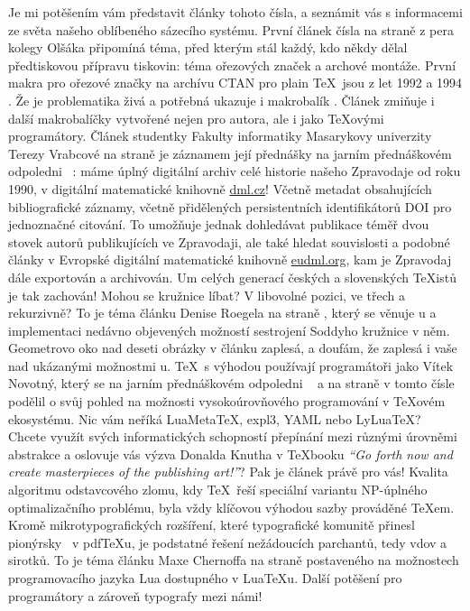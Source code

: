 Je mi potěšením vám představit články tohoto čísla, a seznámit vás s informacemi ze světa našeho oblíbeného sázecího systému.
První článek čísla na straně  z pera kolegy Olšáka připomíná téma, před kterým stál každý, kdo někdy dělal předtiskovou přípravu tiskovin: téma ořezových značek a archové montáže. První makra pro ořezové značky na archívu CTAN pro plain \TeX\ jsou z let 1992 \cite{ungar1992cropmark} a 1994 \cite{taylor1994cropmrks}.  Že je problematika živá a potřebná ukazuje i makrobalík  \cite{wagner2022zwpagelayout}.  Článek zmiňuje i další makrobalíčky vytvořené nejen pro  autora, ale i jako  \TeX ovými programátory.
Článek studentky Fakulty informatiky Masarykovy univerzity Terezy Vrabcové na straně  je záznamem její přednášky na jarním přednáškovém odpoledni \CSTUG\ \cite{cstug2021valna}: máme úplný digitální archiv celé historie našeho Zpravodaje od roku 1990, v digitální matematické knihovně \href{https:/dml.cz}{dml.cz}!  Včetně metadat obsahujících bibliografické záznamy, včetně přidělených persistentních identifikátorů DOI pro jednoznačné citování.  To umožňuje jednak dohledávat publikace téměř dvou stovek autorů publikujících ve Zpravodaji, ale také hledat souvislosti a podobné články v Evropské digitální matematické knihovně \href{https://eudml.org}{eudml.org}, kam je Zpravodaj dále exportován a archivován. Um celých generací českých a slovenských \TeX istů je tak zachován!
Mohou se kružnice líbat? V libovolné pozici, ve třech a rekurzivně?  To je téma článku Denise Roegela na straně , který se věnuje \MP u a implementaci nedávno objevených možností sestrojení Soddyho kružnice v něm.  Geometrovo oko nad deseti obrázky v článku zaplesá, a doufám, že zaplesá i vaše nad ukázanými možnostmi \MP u.
\TeX\ s výhodou používají programátoři jako Vítek Novotný, který se na jarním přednáškovém odpoledni \CSTUG\ \cite{cstug2021valna} a na straně  v tomto čísle podělil o svůj pohled na možnosti vysokoúrovňového programování v \TeX ovém ekosystému.  Nic vám neříká Lua\-Meta\TeX, expl3, \textsc{YAML} nebo LyLua\-\TeX?  Chcete využít svých informatických schopností přepínání mezi různými úrovněmi abstrakce a oslovuje vás výzva Donalda Knutha v \TeX booku \emph{``Go forth now and create masterpieces of the publishing art!''}?  Pak je článek právě pro vás!
Kvalita algoritmu odstavcového zlomu, kdy \TeX\ řeší speciální variantu NP-úplného optimalizačního problému, byla vždy klíčovou výhodou sazby prováděné \TeX em.  Kromě mikrotypografických rozšíření, které typografické komunitě přinesl pionýrsky \THANH\ v pdf\TeX u, je podstatné  řešení nežádoucích parchantů, tedy vdov a sirotků.  To je téma článku Maxe Chernoffa na straně  postaveného na možnostech programovacího jazyka Lua dostupného v Lua\TeX u.  Další potěšení pro programátory a zároveň typografy mezi námi!
